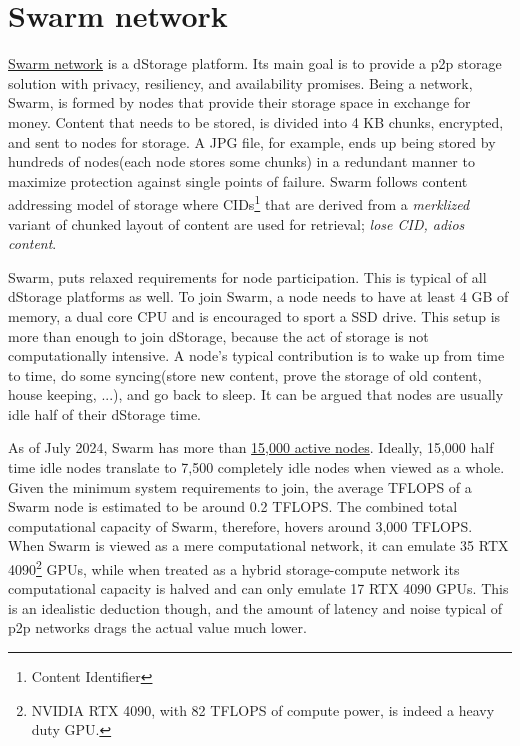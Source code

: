 \documentclass[a4paper, 10pt]{article}
\begin{document}
\section{Swarm network}
\href{https://www.ethswarm.org/}{Swarm network} is a dStorage platform. Its main goal is to provide a p2p storage solution with privacy, resiliency, and availability promises. Being a network, Swarm, is formed by nodes that provide their storage space in exchange for money. Content that needs to be stored, is divided into 4 KB chunks, encrypted, and sent to nodes for storage. A JPG file, for example, ends up being stored by hundreds of nodes(each node stores some chunks) in a redundant manner to maximize protection against single points of failure. Swarm follows content addressing model of storage where CIDs\footnote{Content Identifier} that are derived from a \textit{merklized} variant of chunked layout of content are used for retrieval; \textit{lose CID, adios content}.
\par
Swarm, puts relaxed requirements for node participation. This is typical of all dStorage platforms as well. To join Swarm, a node needs to have at least 4 GB of memory, a dual core CPU and is encouraged to sport a SSD drive. This setup is more than enough to join dStorage, because the act of storage is not computationally intensive. A node's typical contribution is to wake up from time to time, do some syncing(store new content, prove the storage of old content, house keeping, ...), and go back to sleep. It can be argued that nodes are usually idle half of their dStorage time. 
\par
As of July 2024, Swarm has more than \href{https://swarmscan.io/stats/availability}{15,000 active nodes}. Ideally, 15,000 half time idle nodes translate to 7,500 completely idle nodes when viewed as a whole. Given the minimum system requirements to join, the average TFLOPS of a Swarm node is estimated to be around 0.2 TFLOPS. The combined total computational capacity of Swarm, therefore, hovers around 3,000 TFLOPS. When Swarm is viewed as a mere computational network, it can emulate 35 RTX 4090\footnote{NVIDIA RTX 4090, with 82 TFLOPS of compute power, is indeed a heavy duty GPU.} GPUs, while when treated as a hybrid storage-compute network its computational capacity is halved and can only emulate 17 RTX 4090 GPUs. This is an idealistic deduction though, and the amount of latency and noise typical of p2p networks drags the actual value much lower. 
\end{document}
